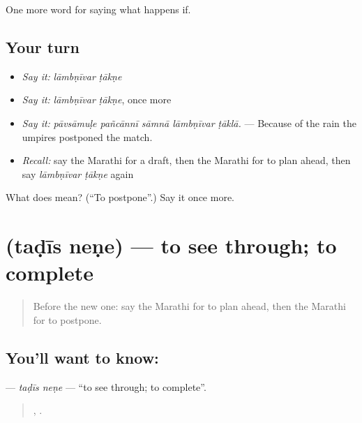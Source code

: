 \begin{grammarlens}[title={What you've built}]
One more word for saying what happens if.
\end{grammarlens}

\subsection*{Your turn}
\begin{itemize}
\raggedright
  \item \emph{Say it:} \emph{lāmbṇīvar ṭākṇe}
  \item \emph{Say it:} \emph{lāmbṇīvar ṭākṇe}, once more
  \item \emph{Say it:} \emph{pāvsāmuḷe pañcānnī sāmnā lāmbṇīvar ṭāklā.} — Because of the rain the umpires postponed the match.
  \item \emph{Recall:} say the Marathi for a draft, then the Marathi for to plan ahead, then say \emph{lāmbṇīvar ṭākṇe} again
\end{itemize}

\begin{tcolorbox}[breakable,colback=teal!4,colframe=teal!35!black,title={Before you move on}]
What does   mean? (\textquotedblleft{}To postpone\textquotedblright{}.) Say it once more.
\end{tcolorbox}
\section[\texorpdfstring{\mr{तडीस} \mr{नेणे} (taḍīs neṇe)}{तडीस नेणे (taḍīs neṇe)}]{  (taḍīs neṇe) — to see through; to complete}

\label{lesson:MR-C544-tadis-nene}



\begin{quote}
Before the new one: say the Marathi for to plan ahead, then the Marathi for to postpone.
\end{quote}

\subsection*{You'll want to know:  }
\textbf{ } — \emph{taḍīs neṇe} — \textquotedblleft{}to see through; to complete\textquotedblright{}.

\begin{quote}
  ,     .
\end{quote}

